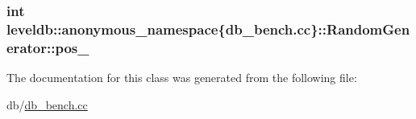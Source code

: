 \subsubsection[{pos\+\_\+}]{\setlength{\rightskip}{0pt plus 5cm}int leveldb\+::anonymous\+\_\+namespace\{db\+\_\+bench.\+cc\}\+::Random\+Generator\+::pos\+\_\+\hspace{0.3cm}{\ttfamily [private]}}\label{classleveldb_1_1anonymous__namespace_02db__bench_8cc_03_1_1_random_generator_a41ae02395285bcf9cadfd3a4feef6b92}


The documentation for this class was generated from the following file\+:\begin{DoxyCompactItemize}
\item 
db/\hyperlink{db__bench_8cc}{db\+\_\+bench.\+cc}\end{DoxyCompactItemize}
